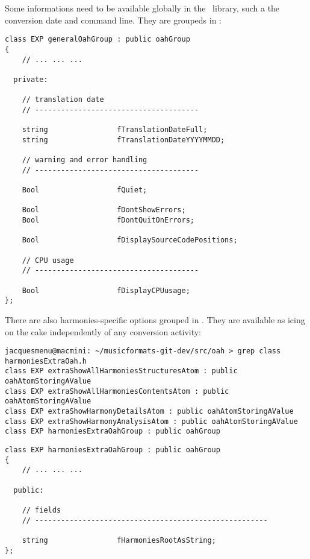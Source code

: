 Some informations need to be available globally in the \mf\ library, such a the conversion date and command line. They are groupeds in :
\begin{lstlisting}[language=CPlusPlus]
class EXP generalOahGroup : public oahGroup
{
	// ... ... ...

  private:

    // translation date
    // --------------------------------------

    string                fTranslationDateFull;
    string                fTranslationDateYYYYMMDD;

    // warning and error handling
    // --------------------------------------

    Bool                  fQuiet;

    Bool                  fDontShowErrors;
    Bool                  fDontQuitOnErrors;

    Bool                  fDisplaySourceCodePositions;

    // CPU usage
    // --------------------------------------

    Bool                  fDisplayCPUusage;
};
\end{lstlisting}

There are also harmonies-specific options grouped in . They are available as icing on the cake independently of any conversion activity:
\begin{lstlisting}[language=Terminal]
jacquesmenu@macmini: ~/musicformats-git-dev/src/oah > grep class harmoniesExtraOah.h
class EXP extraShowAllHarmoniesStructuresAtom : public oahAtomStoringAValue
class EXP extraShowAllHarmoniesContentsAtom : public oahAtomStoringAValue
class EXP extraShowHarmonyDetailsAtom : public oahAtomStoringAValue
class EXP extraShowHarmonyAnalysisAtom : public oahAtomStoringAValue
class EXP harmoniesExtraOahGroup : public oahGroup
\end{lstlisting}

\begin{lstlisting}[language=CPlusPlus]
class EXP harmoniesExtraOahGroup : public oahGroup
{
 	// ... ... ...

  public:

    // fields
    // ------------------------------------------------------

    string                fHarmoniesRootAsString;
};
\end{lstlisting}


